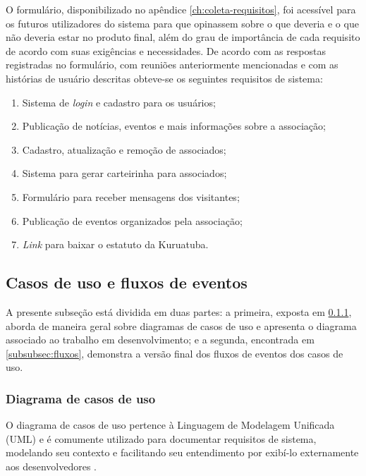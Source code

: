O formulário, disponibilizado no apêndice \ref{ch:coleta-requisitos}, foi acessível para os futuros utilizadores do sistema para que opinassem sobre o que deveria e o que não deveria estar no produto final, além do grau de importância de cada requisito de acordo com suas exigências e necessidades. De acordo com as respostas registradas no formulário, com reuniões anteriormente mencionadas e com as histórias de usuário descritas obteve-se os seguintes requisitos de sistema:

\begin{enumerate}
 \item Sistema de \textit{login} e cadastro para os usuários;
 \item Publicação de notícias, eventos e mais informações sobre a associação;
 \item Cadastro, atualização e remoção de associados;
 \item Sistema para gerar carteirinha para associados;
 \item Formulário para receber mensagens dos visitantes;
 \item Publicação de eventos organizados pela associação;
 \item \textit{Link} para baixar o estatuto da Kuruatuba.
\end{enumerate}


\hspace{2.5cm}
\subsection{Casos de uso e fluxos de eventos}
\label{subsec:usecase}
\hspace{2.5cm}

A presente subseção está dividida em duas partes: a primeira, exposta em \ref{subsubsec:casos-uso}, aborda de maneira geral sobre diagramas de casos de uso e apresenta o diagrama associado ao trabalho em desenvolvimento; e a segunda, encontrada em \ref{subsubsec:fluxos}, demonstra a versão final dos fluxos de eventos dos casos de uso.

\hspace{2.5cm}
\subsubsection{Diagrama de casos de uso}
\label{subsubsec:casos-uso}
\hspace{2.5cm}

O diagrama de casos de uso pertence à Linguagem de Modelagem Unificada (UML) e é comumente utilizado para documentar requisitos de sistema, modelando seu contexto e facilitando seu entendimento por exibí-lo externamente aos desenvolvedores .

